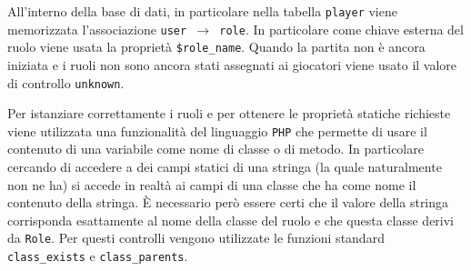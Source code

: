 All'interno della base di dati, in particolare nella tabella \texttt{player} viene memorizzata l'associazione \texttt{user $\rightarrow$ role}. In particolare come chiave esterna del ruolo viene usata la proprietà \texttt{\$role\_name}. Quando la partita non è ancora iniziata e i ruoli non sono ancora stati assegnati ai giocatori viene usato il valore di controllo \texttt{unknown}.

Per istanziare correttamente i ruoli e per ottenere le proprietà statiche richieste viene utilizzata una funzionalità del linguaggio \texttt{PHP} che permette di usare il contenuto di una variabile come nome di classe o di metodo. In particolare cercando di accedere a dei campi statici di una stringa (la quale naturalmente non ne ha) si accede in realtà ai campi di una classe che ha come nome il contenuto della stringa. È necessario però essere certi che il valore della stringa corrisponda esattamente al nome della classe del ruolo e che questa classe derivi da \texttt{Role}. Per questi controlli vengono utilizzate le funzioni standard \texttt{class\_exists} e \texttt{class\_parents}.